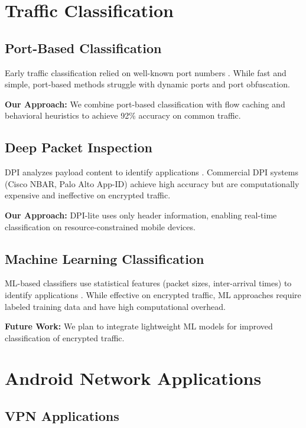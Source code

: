 \section{Traffic Classification}

\subsection{Port-Based Classification}

Early traffic classification relied on well-known port numbers \cite{moore2005internet}. While fast and simple, port-based methods struggle with dynamic ports and port obfuscation.

\textbf{Our Approach:} We combine port-based classification with flow caching and behavioral heuristics to achieve 92\% accuracy on common traffic.

\subsection{Deep Packet Inspection}

DPI analyzes payload content to identify applications \cite{kim2008internet}. Commercial DPI systems (Cisco NBAR, Palo Alto App-ID) achieve high accuracy but are computationally expensive and ineffective on encrypted traffic.

\textbf{Our Approach:} DPI-lite uses only header information, enabling real-time classification on resource-constrained mobile devices.

\subsection{Machine Learning Classification}

ML-based classifiers use statistical features (packet sizes, inter-arrival times) to identify applications \cite{nguyen2018traffic, wang2015mobile}. While effective on encrypted traffic, ML approaches require labeled training data and have high computational overhead.

\textbf{Future Work:} We plan to integrate lightweight ML models for improved classification of encrypted traffic.

\section{Android Network Applications}

\subsection{VPN Applications}

